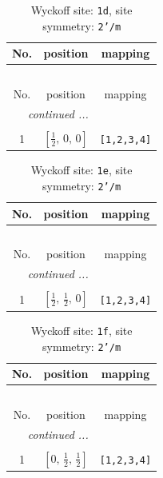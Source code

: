 \documentclass[fleqn,8pt]{jsarticle}
\begin{document}
\renewcommand{\arraystretch}{1.2}
\begin{longtable}{ccc}
\caption{Wyckoff site: {\tt 1d}, site symmetry: {\tt 2'/m}}
 \\
 \hline \hline
No. & position & mapping \\ \hline \endfirsthead

\multicolumn{2}{l}{\tablename\ \thetable{}} \\
 \hline \hline
No. & position & mapping \\ \hline \endhead

 \hline \hline
\multicolumn{2}{r}{\footnotesize\it continued ...} \\ \endfoot

 \hline \hline
\multicolumn{2}{r}{} \\ \endlastfoot

1 & $\left[ \frac{1}{2},\, 0,\, 0 \right]$ & {\tt [1,2,3,4]} \\
\end{longtable}
\renewcommand{\arraystretch}{1.2}
\begin{longtable}{ccc}
\caption{Wyckoff site: {\tt 1e}, site symmetry: {\tt 2'/m}}
 \\
 \hline \hline
No. & position & mapping \\ \hline \endfirsthead

\multicolumn{2}{l}{\tablename\ \thetable{}} \\
 \hline \hline
No. & position & mapping \\ \hline \endhead

 \hline \hline
\multicolumn{2}{r}{\footnotesize\it continued ...} \\ \endfoot

 \hline \hline
\multicolumn{2}{r}{} \\ \endlastfoot

1 & $\left[ \frac{1}{2},\, \frac{1}{2},\, 0 \right]$ & {\tt [1,2,3,4]} \\
\end{longtable}
\renewcommand{\arraystretch}{1.2}
\begin{longtable}{ccc}
\caption{Wyckoff site: {\tt 1f}, site symmetry: {\tt 2'/m}}
 \\
 \hline \hline
No. & position & mapping \\ \hline \endfirsthead

\multicolumn{2}{l}{\tablename\ \thetable{}} \\
 \hline \hline
No. & position & mapping \\ \hline \endhead

 \hline \hline
\multicolumn{2}{r}{\footnotesize\it continued ...} \\ \endfoot

 \hline \hline
\multicolumn{2}{r}{} \\ \endlastfoot

1 & $\left[ 0,\, \frac{1}{2},\, \frac{1}{2} \right]$ & {\tt [1,2,3,4]} \\
\end{longtable}
\end{document}

